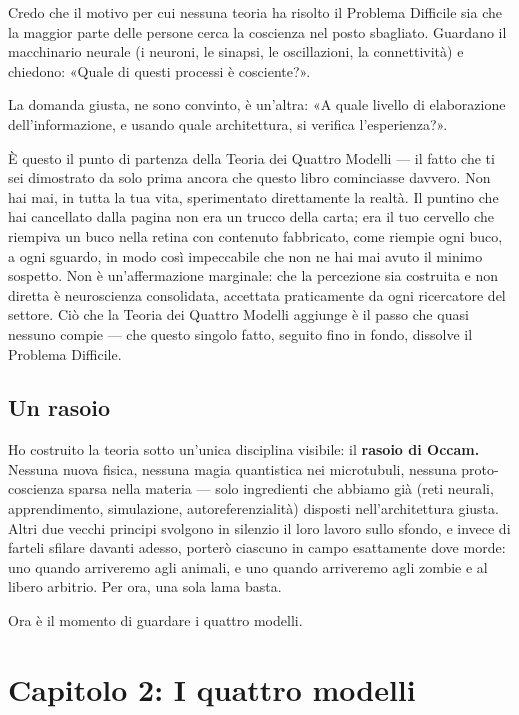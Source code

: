 \documentclass[11pt, twoside, openright]{book}
\begin{document}
Credo che il motivo per cui nessuna teoria ha risolto il Problema Difficile sia che la maggior parte delle persone cerca la coscienza nel posto sbagliato. Guardano il macchinario neurale (i neuroni, le sinapsi, le oscillazioni, la connettività) e chiedono: «Quale di questi processi è cosciente?».

La domanda giusta, ne sono convinto, è un'altra: «A quale livello di elaborazione dell'informazione, e usando quale architettura, si verifica l'esperienza?».

È questo il punto di partenza della Teoria dei Quattro Modelli --- il fatto che ti sei dimostrato da solo prima ancora che questo libro cominciasse davvero. Non hai mai, in tutta la tua vita, sperimentato direttamente la realtà. Il puntino che hai cancellato dalla pagina non era un trucco della carta; era il tuo cervello che riempiva un buco nella retina con contenuto fabbricato, come riempie ogni buco, a ogni sguardo, in modo così impeccabile che non ne hai mai avuto il minimo sospetto. Non è un'affermazione marginale: che la percezione sia costruita e non diretta è neuroscienza consolidata, accettata praticamente da ogni ricercatore del settore. Ciò che la Teoria dei Quattro Modelli aggiunge è il passo che quasi nessuno compie --- che questo singolo fatto, seguito fino in fondo, dissolve il Problema Difficile.

\section*{Un rasoio}

Ho costruito la teoria sotto un'unica disciplina visibile: il \textbf{rasoio di Occam.} Nessuna nuova fisica, nessuna magia quantistica nei microtubuli, nessuna proto-coscienza sparsa nella materia --- solo ingredienti che abbiamo già (reti neurali, apprendimento, simulazione, autoreferenzialità) disposti nell'architettura giusta. Altri due vecchi principi svolgono in silenzio il loro lavoro sullo sfondo, e invece di farteli sfilare davanti adesso, porterò ciascuno in campo esattamente dove morde: uno quando arriveremo agli animali, e uno quando arriveremo agli zombie e al libero arbitrio. Per ora, una sola lama basta.

Ora è il momento di guardare i quattro modelli.


\chapter*{Capitolo 2: I quattro modelli}
\end{document}
